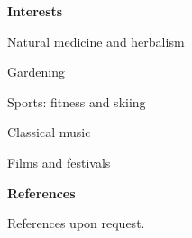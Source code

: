 \documentclass[a4paper,12pt,final]{memoir}
\newcommand{\Sep}{\vspace{1.5em}}
\newcommand{\SmallSep}{\vspace{0.5em}}
\newenvironment{Career Profile}
	{\ignorespaces\textbf{\color{ForestGreen} Career Profile}}
	{\Sep\ignorespacesafterend}
\newenvironment{Key experience}
	{\ignorespaces\textbf{\color{ForestGreen} Key experience}}
	{\Sep\ignorespacesafterend}
\newcommand{\CVSection}[1]
	{\Large\textbf{#1}\par
	\SmallSep\normalsize\normalfont}
\newcommand{\CVItem}[1]
	{\textbf{\color{ForestGreen} #1}}
\begin{document}
\CVItem{Interests}
\begin{multicols}{3}
\begin{compactitem}[\color{ForestGreen}$\circ$]
	\item Natural medicine and herbalism
	\item Gardening
	\item Sports: fitness and skiing 
	\item Classical music 
	\item Films and  festivals
\end{compactitem}
\end{multicols}
\Sep 

\CVSection{References}
References upon request.

\end{document}
